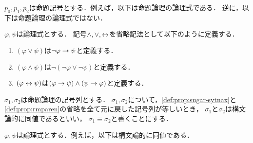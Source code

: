 \begin{myExample}[命題論理の論理式の例]
  $p_0,p_1,p_2$は命題記号とする．例えば，以下は命題論理の論理式である．
  逆に，以下は命題論理の論理式ではない．
\end{myExample}

\begin{myDefinition}
  \label{def:prop:sugar-sytnax}
  $\varphi, \psi$は論理式とする．
  記号$\land, \lor, \leftrightarrow$を省略記法として以下のように定義する．
  \begin{enumerate}
    \item $(\varphi \lor \psi)$は$\lnot\varphi \to \psi$と定義する．
    \item $(\varphi \land \psi)$は$\lnot(\lnot\varphi \lor \lnot\psi)$と定義する．
    \item $(\varphi \leftrightarrow \psi)$は$(\varphi \to \psi) \land (\psi \to \varphi)$と定義する．
  \end{enumerate}
\end{myDefinition}

\begin{myDefinition}[括弧の省略]
  \label{def:prop:rmparen}
\end{myDefinition}

\begin{myDefinition}[構文論的同値]
  $\sigma_1,\sigma_2$は命題論理の記号列とする．
  $\sigma_1,\sigma_2$について，\ref*{def:prop:sugar-sytnax}と\ref*{def:prop:rmparen}の省略を全て元に戻した記号列が等しいとき，
  $\sigma_1$と$\sigma_2$は構文論的に同値であるといい，
  $\sigma_1 \equiv \sigma_2$と書くことにする．
\end{myDefinition}

\begin{myExample}[構文論的同値の例]
  $\varphi, \psi$は論理式とする．例えば，以下は構文論的に同値である．
\end{myExample}
